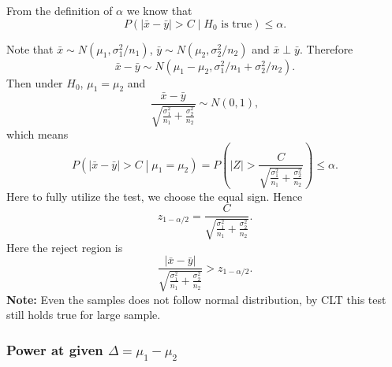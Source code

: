\documentclass[a4paper,12pt]{article}
\begin{document}
From the definition of $\alpha$ we know that 
\[
  P\left(
    \left|\bar{x} - \bar{y}\right| >C
    \middle|
    H_0\text{ is true}
  \right)
  \leq \alpha
  .
\]

Note that $\bar{x}\sim N\left(\mu_1, \sigma_1^2 / n_1\right)$, $\bar{y}\sim N\left(\mu_2, \sigma_2^2 / n_2\right)$ and $\bar{x}\perp\bar{y}$. Therefore
\[
  \bar{x} - \bar{y} \sim N\left(\mu_1 - \mu_2, \sigma_1^2/n_1 + \sigma_2^2 / n_2\right)
  .
\]
Then under $H_0$, $\mu_1 = \mu_2$ and
\[
  \frac{
    \bar{x} - \bar{y}
  }{
    \sqrt{\frac{\sigma_1^2}{n_1} + \frac{\sigma_2^2}{n_2}}
  }
  \sim
  N\left(0, 1\right)
  ,
\]
which means
\[
  P\left(\left|\bar{x} - \bar{y}\right| > C
    \middle| \mu_1 = \mu_2
  \right)
  = P\left(
    \left|Z\right|
    > \frac{
      C
    }{
      \sqrt{\frac{\sigma_1^2}{n_1} + \frac{\sigma_2^2}{n_2}}
    }
  \right)
  \leq \alpha
  .
\]
Here to fully utilize the test, we choose the equal sign. Hence
\[
  z_{1 - \alpha / 2} =
  \frac{
    C
  }{
    \sqrt{\frac{\sigma_1^2}{n_1} + \frac{\sigma_2^2}{n_2}}
  }
  .
\]
Here the reject region is
\[
  \frac{\left|\bar{x} - \bar{y}\right|}{
    \sqrt{
      \frac{\sigma_1^2}{n_1} + \frac{\sigma_2^2}{n_2}
    }
  }
  > z_{1 - \alpha /2}
  .
\]
\textbf{Note: } Even the samples does not follow normal distribution, by CLT this test still holds true for large sample.

\subsubsection{Power at given $\Delta = \mu_1 - \mu_2$}
\label{sec:power-at-given-2}
\end{document}
